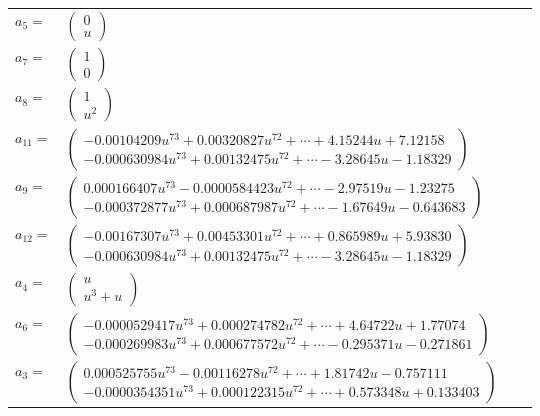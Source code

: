 \documentclass[1p]{elsarticle_modified}
\theoremstyle{definition}
\begin{document}
\begin{tabular}{m{7pt} m{180pt} m{7pt} m{180pt} }
\flushright $a_{5}=$&$\begin{pmatrix}0\\u\end{pmatrix}$ \\
\flushright $a_{7}=$&$\begin{pmatrix}1\\0\end{pmatrix}$ \\
\flushright $a_{8}=$&$\begin{pmatrix}1\\u^2\end{pmatrix}$ \\
\flushright $a_{11}=$&$\begin{pmatrix}-0.00104209 u^{73}+0.00320827 u^{72}+\cdots+4.15244 u+7.12158\\-0.000630984 u^{73}+0.00132475 u^{72}+\cdots-3.28645 u-1.18329\end{pmatrix}$ \\
\flushright $a_{9}=$&$\begin{pmatrix}0.000166407 u^{73}-0.0000584423 u^{72}+\cdots-2.97519 u-1.23275\\-0.000372877 u^{73}+0.000687987 u^{72}+\cdots-1.67649 u-0.643683\end{pmatrix}$ \\
\flushright $a_{12}=$&$\begin{pmatrix}-0.00167307 u^{73}+0.00453301 u^{72}+\cdots+0.865989 u+5.93830\\-0.000630984 u^{73}+0.00132475 u^{72}+\cdots-3.28645 u-1.18329\end{pmatrix}$ \\
\flushright $a_{4}=$&$\begin{pmatrix}u\\u^3+u\end{pmatrix}$ \\
\flushright $a_{6}=$&$\begin{pmatrix}-0.0000529417 u^{73}+0.000274782 u^{72}+\cdots+4.64722 u+1.77074\\-0.000269983 u^{73}+0.000677572 u^{72}+\cdots-0.295371 u-0.271861\end{pmatrix}$ \\
\flushright $a_{3}=$&$\begin{pmatrix}0.000525755 u^{73}-0.00116278 u^{72}+\cdots+1.81742 u-0.757111\\-0.0000354351 u^{73}+0.000122315 u^{72}+\cdots+0.573348 u+0.133403\end{pmatrix}$ \\

\end{tabular}
\end{document}
